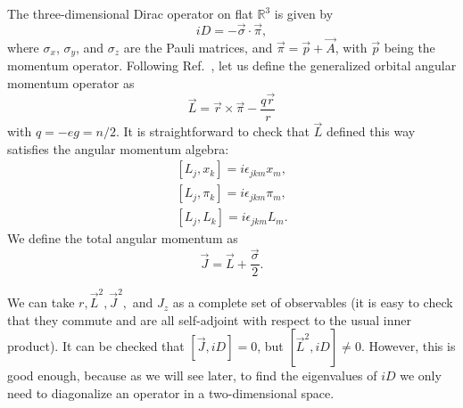 \documentclass[a4paper,12pt, amsfonts, amssymb]{article}
\newcommand{\RR}{{\mathbb R}}
\begin{document}
The three-dimensional Dirac operator on flat $\RR^3$ is 
given by
\begin{equation*}
iD=-{\vec{\sigma}}\cdot{\vec{\pi}},
\end{equation*}
where $\sigma_x$, $\sigma_y$, and $\sigma_z$ are the Pauli matrices, and 
${\vec{\pi}}=\vec{p}+\vec{A}$, with $\vec{p}$ being the momentum 
operator. Following Ref.~\cite{WY}, let us define the generalized orbital angular momentum operator as
\begin{equation*}
\vec{L}=\vec{r}\times\vec{\pi}-\frac{q\vec{r}}{r}
\end{equation*}
with $q=-eg=n/2$.
It is straightforward to check that $\vec{L}$ defined this way satisfies 
the angular momentum algebra:
\begin{eqnarray}
\left[ L_j, x_k \right]=i\epsilon_{jkm}x_m,\nonumber\\
\left[ L_j, \pi_k \right]=i\epsilon_{jkm}\pi_m,\nonumber\\
\left[ L_j, L_k \right]=i\epsilon_{jkm}L_m.\nonumber
\end{eqnarray}
We define the total angular momentum as
\begin{equation*}
\vec{J}=\vec{L}+\frac{\vec{\sigma}}{2}.
\end{equation*}

We can take $r, {\vec{L}}^2, {\vec{J}}^2,$ and $J_z$ as 
a complete set of observables (it is easy to check that they commute and 
are all self-adjoint with respect to the usual inner product). It can be checked that $\left[ \vec{J}, iD \right]=0$, but $\left[\vec{L}^2, iD\right]\neq0$. 
However, this is good enough, because as we will see later, to find the 
eigenvalues of $iD$ we only need to diagonalize an operator in
a two-dimensional space.
\end{document}
